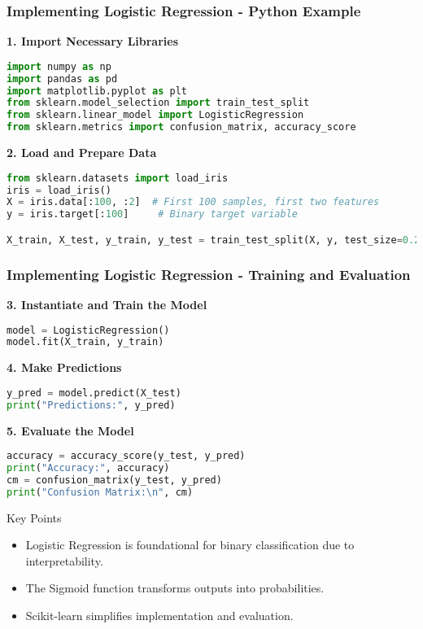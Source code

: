\documentclass[aspectratio=169]{beamer}
\begin{document}
\begin{frame}[fragile]
    \frametitle{Implementing Logistic Regression - Python Example}

    \textbf{1. Import Necessary Libraries}
    \begin{lstlisting}[language=Python]
import numpy as np
import pandas as pd
import matplotlib.pyplot as plt
from sklearn.model_selection import train_test_split
from sklearn.linear_model import LogisticRegression
from sklearn.metrics import confusion_matrix, accuracy_score
    \end{lstlisting}

    \textbf{2. Load and Prepare Data}
    \begin{lstlisting}[language=Python]
from sklearn.datasets import load_iris
iris = load_iris()
X = iris.data[:100, :2]  # First 100 samples, first two features
y = iris.target[:100]     # Binary target variable

X_train, X_test, y_train, y_test = train_test_split(X, y, test_size=0.2, random_state=42)
    \end{lstlisting}
\end{frame}

\begin{frame}[fragile]
    \frametitle{Implementing Logistic Regression - Training and Evaluation}

    \textbf{3. Instantiate and Train the Model}
    \begin{lstlisting}[language=Python]
model = LogisticRegression()
model.fit(X_train, y_train)
    \end{lstlisting}

    \textbf{4. Make Predictions}
    \begin{lstlisting}[language=Python]
y_pred = model.predict(X_test)
print("Predictions:", y_pred)
    \end{lstlisting}

    \textbf{5. Evaluate the Model}
    \begin{lstlisting}[language=Python]
accuracy = accuracy_score(y_test, y_pred)
print("Accuracy:", accuracy)
cm = confusion_matrix(y_test, y_pred)
print("Confusion Matrix:\n", cm)
    \end{lstlisting}
  
    \begin{block}{Key Points}
        \begin{itemize}
            \item Logistic Regression is foundational for binary classification due to interpretability.
            \item The Sigmoid function transforms outputs into probabilities.
            \item Scikit-learn simplifies implementation and evaluation.
        \end{itemize}
    \end{block}
\end{frame}
\end{document}
